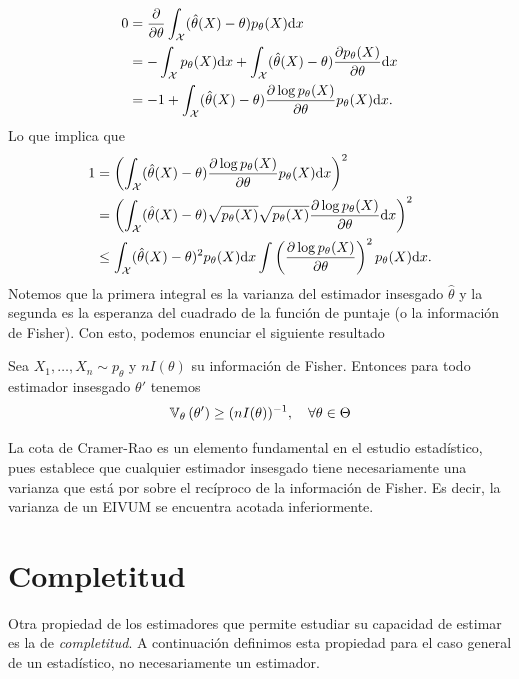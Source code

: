 \begin{align*}
	0 &= \frac{\partial}{\partial\theta}\int_{\mathcal X} (\hat{\theta}(X)-\theta)p_\theta(X){\text{d}x}\\
	  &= -\int_{\mathcal X} p_\theta(X){\text{d}x}  + \int_{\mathcal X} (\hat{\theta}(X)-\theta)\frac{\partial p_\theta(X)}{\partial\theta}{\text{d}x}\\
	  &= -1  + \int_{\mathcal X} (\hat{\theta}(X)-\theta)\frac{\partial\log p_\theta(X) }{\partial\theta}p_\theta(X){\text{d}x}.
\end{align*}
Lo que implica que 
\begin{align*}
	1 &= \left(\int_{\mathcal X} (\hat{\theta}(X)-\theta)\frac{\partial\log p_\theta(X) }{\partial\theta}p_\theta(X){\text{d}x}\right)^2\\
	&=\left(\int_{\mathcal X} (\hat{\theta}(X)-\theta)\sqrt{p_\theta(X)}\sqrt{p_\theta(X)}\frac{\partial\log p_\theta(X) }{\partial\theta}{\text{d}x}\right)^2\\
	&\leq\int_{\mathcal X} (\hat{\theta}(X)-\theta)^2 p_\theta(X){\text{d}x} \int\left(\frac{\partial\log p_\theta(X) }{\partial\theta}\right)^2 p_\theta(X){\text{d}x}.
\end{align*}
Notemos que la primera integral es la varianza del estimador insesgado $\hat\theta$ y la segunda es la esperanza del cuadrado de la función de puntaje (o la información de Fisher). Con esto, podemos enunciar el siguiente resultado 
\begin{definition}
	Sea $X_1,\ldots,X_n \sim p_\theta$ y $nI(\theta)$ su información de Fisher. Entonces para todo estimador insesgado $\theta'$ tenemos 
	\begin{equation}
		\mathbb{V}_\theta \left(\theta'\right)\geq (nI(\theta))^{-1},\quad \forall \theta\in\Theta
	\end{equation}
\end{definition}
La cota de Cramer-Rao es un elemento fundamental en el estudio estadístico, pues establece que cualquier estimador insesgado tiene necesariamente una varianza que está por sobre el recíproco de la información de Fisher. Es decir, la varianza de un EIVUM se encuentra acotada inferiormente.


\section{Completitud}

Otra propiedad de los estimadores que permite estudiar su capacidad de estimar es la de \textit{completitud}. A continuación definimos esta propiedad para el caso general de un estadístico, no necesariamente un estimador.

